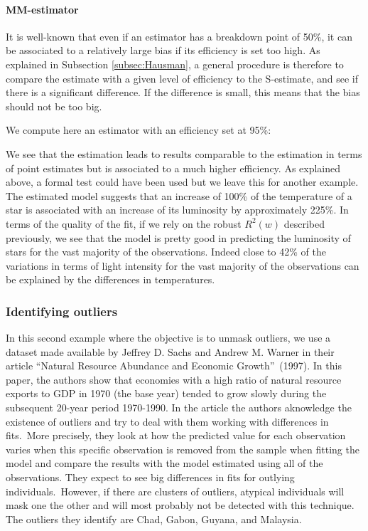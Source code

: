 \paragraph{MM-estimator}

It is well-known that even if an  estimator has a breakdown point of 50\%,
it can be associated to a relatively large bias if its efficiency is set too
high. As explained in Subsection \ref{subsec:Hausman}, a general procedure is
therefore to compare the  estimate with a given level of efficiency to the
S-estimate, and see if there is a significant difference. If the difference
is small, this means that the bias should not be too big.

We compute here an  estimator with an efficiency set at 95\%:


\begin{stlog}

\end{stlog}

We see that the  estimation leads to results comparable to the
 estimation in terms of point estimates but is associated to a much
higher efficiency. As explained above, a formal test could have been used but
we leave this for another example. The  estimated model suggests that
an increase of 100\% of the temperature of a star is associated with an
increase of its luminosity by approximately 225\%. In terms of the quality of
the fit, if we rely on the robust $R^2(w)$ described previously, we see that
the model is pretty good in predicting the luminosity of stars for the vast
majority of the observations. Indeed close to 42\% of the variations in terms
of light intensity for the vast majority of the observations can be explained
by the differences in temperatures.


\subsubsection{Identifying outliers} 

In this second example where the objective is
to unmask outliers, we use a dataset made available by Jeffrey D. Sachs and
Andrew M. Warner in their article \textquotedblleft Natural Resource Abundance
and Economic Growth\textquotedblright\ (1997). In this paper, the authors show
that economies with a high ratio of natural resource exports to GDP in 1970
(the base year) tended to grow slowly during the subsequent 20-year period
1970-1990. In the article the authors aknowledge the existence of outliers and
try to deal with them working with differences in fits.\ More precisely, they
look at how the predicted value for each observation varies when this specific
observation is removed from the sample when fitting the model and compare the
results with the model estimated using all of the observations. They expect to
see big differences in fits for outlying individuals.\ However, if there are
clusters of outliers, atypical individuals will mask one the other and will
most probably not be detected with this technique. The outliers they identify
are Chad, Gabon, Guyana, and Malaysia.

